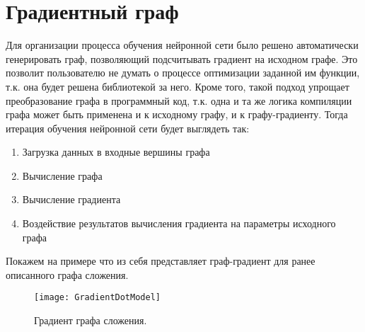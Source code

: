 \clearpage
\section{Градиентный граф}
Для организации процесса обучения нейронной сети было решено автоматически генерировать граф, позволяющий подсчитывать градиент на исходном графе. Это позволит пользователю не думать о процессе оптимизации заданной им функции, т.к. она будет решена библиотекой за него. Кроме того, такой подход упрощает преобразование графа в программный код, т.к. одна и та же логика компиляции графа может быть применена и к исходному графу, и к графу-градиенту. Тогда итерация обучения нейронной сети будет выглядеть так:
\begin{enumerate}
    \item Загрузка данных в входные вершины графа
    \item Вычисление графа
    \item Вычисление градиента
    \item Воздействие результатов вычисления градиента на параметры исходного графа
\end{enumerate}
\par
Покажем на примере что из себя представляет граф-градиент для ранее описанного графа сложения.
\begin{figure}[H]
    \centering
    \texttt{[image: GradientDotModel]}
    \caption{Градиент графа сложения.}
    \label{GradientDotModel}
\end{figure}

